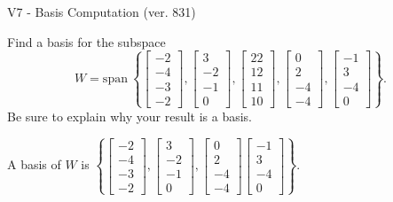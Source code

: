 \begin{exercise}
  \begin{exerciseTitle}V7 - Basis Computation (ver. 831)\end{exerciseTitle}
  \begin{exerciseStatement}
    Find a basis for the subspace 
\[W=\mathrm{span}\ \left\{\left[\begin{array}{r}
-2 \\
-4 \\
-3 \\
-2
\end{array}\right] , \left[\begin{array}{r}
3 \\
-2 \\
-1 \\
0
\end{array}\right] , \left[\begin{array}{r}
22 \\
12 \\
11 \\
10
\end{array}\right] , \left[\begin{array}{r}
0 \\
2 \\
-4 \\
-4
\end{array}\right] , \left[\begin{array}{r}
-1 \\
3 \\
-4 \\
0
\end{array}\right]\right\}.\]
 Be sure to explain why your result is a basis.


  \end{exerciseStatement}
  \begin{exerciseAnswer}
   A basis of \(W\) is  \(\left\{\left[\begin{array}{r}
-2 \\
-4 \\
-3 \\
-2
\end{array}\right] , \left[\begin{array}{r}
3 \\
-2 \\
-1 \\
0
\end{array}\right] , \left[\begin{array}{r}
0 \\
2 \\
-4 \\
-4
\end{array}\right] \left[\begin{array}{r}
-1 \\
3 \\
-4 \\
0
\end{array}\right]\right\}\).
  


  \end{exerciseAnswer}
\end{exercise}